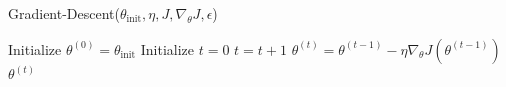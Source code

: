 \documentclass{article}
\begin{document}
\begin{algorithm*}
\caption{Gradient-Descent($\theta_{\text{init}}, \eta, J, \nabla_\theta J, \epsilon$)}
\label{alg:gradient-descent}
\begin{algorithmic}[1]
\STATE Initialize $\theta^{(0)} = \theta_{\text{init}}$
\STATE Initialize $t = 0$
\REPEAT
  \STATE $t = t + 1$
  \STATE $\theta^{(t)} = \theta^{(t-1)} - \eta \nabla_\theta J(\theta^{(t-1)})$
\RETURN $\theta^{(t)}$
\end{algorithmic}
\end{algorithm*}
\end{document}

